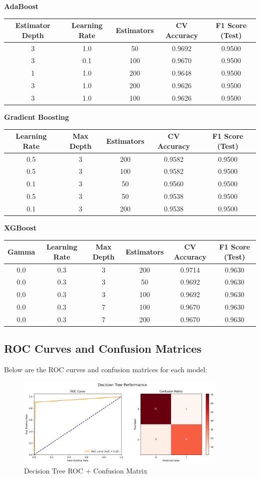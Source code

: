 \documentclass[12pt]{article}
\begin{document}
\vspace{1em}
\textbf{AdaBoost}
\begin{tabular}{|c|c|c|c|c|}
\hline
Estimator Depth & Learning Rate & Estimators & CV Accuracy & F1 Score (Test) \\
\hline
3 & 1.0 & 50 & 0.9692 & 0.9500 \\
3 & 0.1 & 100 & 0.9670 & 0.9500 \\
1 & 1.0 & 200 & 0.9648 & 0.9500 \\
3 & 1.0 & 200 & 0.9626 & 0.9500 \\
3 & 1.0 & 100 & 0.9626 & 0.9500 \\
\hline
\end{tabular}

\vspace{1em}
\textbf{Gradient Boosting}
\begin{tabular}{|c|c|c|c|c|}
\hline
Learning Rate & Max Depth & Estimators & CV Accuracy & F1 Score (Test) \\
\hline
0.5 & 3 & 200 & 0.9582 & 0.9500 \\
0.5 & 3 & 100 & 0.9582 & 0.9500 \\
0.1 & 3 & 50 & 0.9560 & 0.9500 \\
0.5 & 3 & 50 & 0.9538 & 0.9500 \\
0.1 & 3 & 200 & 0.9538 & 0.9500 \\
\hline
\end{tabular}

\vspace{1em}
\textbf{XGBoost}
\begin{tabular}{|c|c|c|c|c|c|}
\hline
Gamma & Learning Rate & Max Depth & Estimators & CV Accuracy & F1 Score (Test) \\
\hline
0.0 & 0.3 & 3 & 200 & 0.9714 & 0.9630 \\
0.0 & 0.3 & 3 & 50 & 0.9692 & 0.9630 \\
0.0 & 0.3 & 3 & 100 & 0.9692 & 0.9630 \\
0.0 & 0.3 & 7 & 100 & 0.9670 & 0.9630 \\
0.0 & 0.3 & 7 & 200 & 0.9670 & 0.9630 \\
\hline
\end{tabular}

\subsection*{ROC Curves and Confusion Matrices}
Below are the ROC curves and confusion matrices for each model:

\begin{figure}[H]
\centering
\includegraphics[width=0.9\textwidth]{images/dt.png}
\caption{Decision Tree ROC + Confusion Matrix}
\end{figure}
\end{document}
